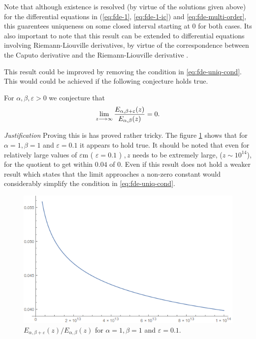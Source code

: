 Note that although existence is resolved (by virtue of the solutions given above)
for the differential equations in (\ref{eq:fde-1}, \ref{eq:fde-1-ic}) and \ref{eq:fde-multi-order}, this 
guarentees uniqueness on some closed interval starting at $ 0 $ for both cases. Its also important
to note that this result can be extended to differential equations involving Riemann-Liouville derivatives, by 
virtue of the correspondence between the Caputo derivative and the Riemann-Liouville derivative \cite{Podlubny1999}. 

This result could be improved by removing the condition  in \eqref{eq:fde-uniq-cond}. This would could be achieved if the following conjecture holds true.
\begin{mdframed}[innertopmargin=10pt]
\begin{conjecture}
    For $ \alpha, \beta, \varepsilon > 0 $ we conjecture that
    \begin{align}
        \lim_{z\longrightarrow \infty} \frac{E_{\alpha, \beta + \varepsilon}(z)}{E_{\alpha, \beta}(z)} = 0.
    \end{align}
\end{conjecture}
\end{mdframed}
\emph{Justification}
Proving this is has proved rather tricky. The figure \ref{fig:mittag-quotient} shows that for $ \alpha = 1, \beta = 1 $ and $ \varepsilon = 0.1 $ it appears to hold true. It should be noted that even for relatively large values of $ \varepsilon $m ( $ \varepsilon = 0.1 $ ) $, z $ needs to be extremely large, ($ z \sim 10^{14} $), for the quotient to get within $ 0.04 $ of $ 0 $. Even if this result does not hold a weaker result which states that the limit approaches a non-zero constant would considerably simplify the condition in \eqref{eq:fde-uniq-cond}.
\begin{figure}[H]
\includegraphics[scale=0.6]{images/Mittag-Leffler-Quotient}
\caption{$ E_{\alpha, \beta + \varepsilon}(z) / E_{\alpha, \beta}(z) $ for $ \alpha = 1, \beta = 1 $ and $ \varepsilon = 0.1 $.}
\label{fig:mittag-quotient}
\end{figure}


